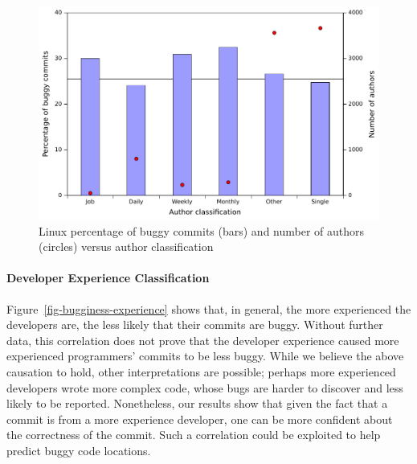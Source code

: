 \begin{figure}
\begin{center}
\includegraphics[width=\columnwidth]{linux-bugginess-author-class.pdf}
\end{center}
\caption{Linux percentage of buggy commits (bars) and number of authors (circles) versus author classification}
\label{fig-linux-bugginess-author-class}
\end{figure}




\paragraph{Developer Experience Classification}

Figure~\ref{fig-bugginess-experience} %
shows that, in general, the more experienced the developers are, the less likely that their commits are buggy.
Without further data, this correlation does not prove that the developer experience caused more 
experienced programmers' commits to be less buggy. 
While we believe the above causation to hold, other interpretations are possible; perhaps more experienced developers wrote 
more complex code, whose bugs are harder to discover and less likely to be reported. 
Nonetheless, our results show that given the fact that a commit is from a more experience developer, 
one can be more confident about the correctness of the commit. Such a correlation could be exploited 
to help predict buggy code locations.


